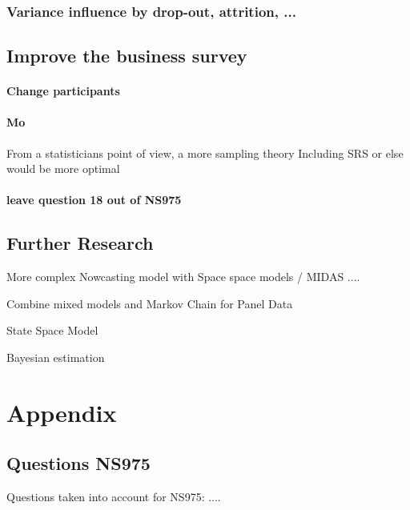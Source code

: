 \documentclass[12pt,a4paper,oneside]{book}
\begin{document}
\subsection*{Variance influence by drop-out, attrition, ...}

\section{Improve the business survey}

\subsubsection*{Change participants}

\subsubsection*{Mo}
From a statisticians point of view, a more sampling theory Including SRS or else would be more optimal

\subsubsection{leave question 18 out of NS975}

\section{Further Research}



More complex Nowcasting model with Space space models / MIDAS ....

Combine mixed models and Markov Chain for Panel Data \citep{de_haan-rietdijk_use_2017} 

State Space Model

Bayesian estimation \cite{bialowolski_bayesian_nodate}

\nocite{hlavac_stargazer:_2018}


 


  
\begin{appendix}
  \listoffigures
  \listoftables
\end{appendix}


\chapter*{Appendix}

\section{Questions NS975}
\label{Appendix: Question NS975 description}
Questions taken into account for NS975:
....
\end{document}
